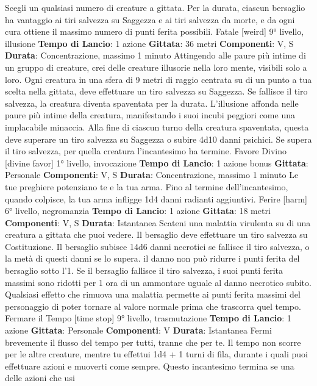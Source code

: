 \begin{multicols}{2}
Scegli un qualsiasi numero di creature a gittata. Per la
durata, ciascun bersaglio ha vantaggio ai tiri salvezza
su Saggezza e ai tiri salvezza da morte, e da ogni cura
ottiene il massimo numero di punti ferita possibili.
Fatale
[weird]
9° livello, illusione
\textbf{Tempo di Lancio}: 1 azione
\textbf{Gittata}: 36 metri
\textbf{Componenti}: V, S
\textbf{Durata}: Concentrazione, massimo 1 minuto
Attingendo alle paure più intime di un gruppo di
creature, crei delle creature illusorie nella loro mente,
visibili solo a loro. Ogni creatura in una sfera di 9 metri
di raggio centrata su di un punto a tua scelta nella
gittata, deve effettuare un tiro salvezza su Saggezza.
Se fallisce il tiro salvezza, la creatura diventa
spaventata per la durata. L’illusione affonda nelle paure
più intime della creatura, manifestando i suoi incubi
peggiori come una implacabile minaccia. Alla fine di
ciascun turno della creatura spaventata, questa deve
superare un tiro salvezza su Saggezza o subire 4d10
danni psichici. Se supera il tiro salvezza, per quella
creatura l’incantesimo ha termine.
Favore Divino
[divine favor]
1° livello, invocazione
\textbf{Tempo di Lancio}: 1 azione bonus
\textbf{Gittata}: Personale
\textbf{Componenti}: V, S
\textbf{Durata}: Concentrazione, massimo 1 minuto
Le tue preghiere potenziano te e la tua arma. Fino al
termine dell’incantesimo, quando colpisce, la tua arma
infligge 1d4 danni radianti aggiuntivi.
Ferire
[harm]
6° livello, negromanzia
\textbf{Tempo di Lancio}: 1 azione
\textbf{Gittata}: 18 metri
\textbf{Componenti}: V, S
\textbf{Durata}: Istantanea
Scateni una malattia virulenta su di una creatura a
gittata che puoi vedere. Il bersaglio deve effettuare un
tiro salvezza su Costituzione. Il bersaglio subisce 14d6
danni necrotici se fallisce il tiro salvezza, o la metà di
questi danni se lo supera. il danno non può ridurre i
punti ferita del bersaglio sotto l’1. Se il bersaglio fallisce
il tiro salvezza, i suoi punti ferita massimi sono ridotti
per 1 ora di un ammontare uguale al danno necrotico
subito. Qualsiasi effetto che rimuova una malattia
permette ai punti ferita massimi del personaggio di
poter tornare al valore normale prima che trascorra quel
tempo.
Fermare il Tempo
[time stop]
9° livello, trasmutazione
\textbf{Tempo di Lancio}: 1 azione
\textbf{Gittata}: Personale
\textbf{Componenti}: V
\textbf{Durata}: Istantanea
Fermi brevemente il flusso del tempo per tutti, tranne
che per te. Il tempo non scorre per le altre creature, 
mentre tu effettui 1d4 + 1 turni di fila, durante i quali
puoi effettuare azioni e muoverti come sempre.
Questo incantesimo termina se una delle azioni che usi

\end{multicols}
